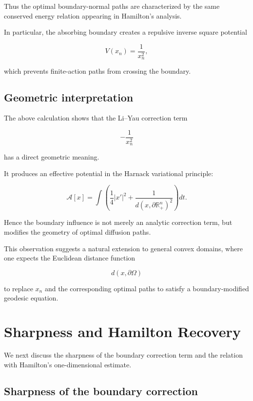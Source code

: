 \documentclass[10pt,a4paper]{amsart}
\begin{document}
Thus the optimal boundary-normal paths are characterized by the
same conserved energy relation appearing in Hamilton's analysis.

In particular, the absorbing boundary creates a repulsive inverse
square potential

\[
V(x_n)=\frac1{x_n^2},
\]

which prevents finite-action paths from crossing the boundary.



\subsection{Geometric interpretation}


The above calculation shows that the Li--Yau correction term

\[
-\frac1{x_n^2}
\]

has a direct geometric meaning.

It produces an effective potential in the Harnack variational
principle:

\[
\mathcal A[x]
=
\int
\left(
\frac14|x'|^2
+
\frac1{
d(x,\partial\mathbb R^n_+)^2
}
\right)dt .
\]


Hence the boundary influence is not merely an analytic correction
term, but modifies the geometry of optimal diffusion paths.

This observation suggests a natural extension to general convex
domains, where one expects the Euclidean distance function

\[
d(x,\partial\Omega)
\]

to replace $x_n$ and the corresponding optimal paths to satisfy a
boundary-modified geodesic equation.


\section{Sharpness and Hamilton Recovery}


We next discuss the sharpness of the boundary correction term and
the relation with Hamilton's one-dimensional estimate.


\subsection{Sharpness of the boundary correction}
\end{document}
